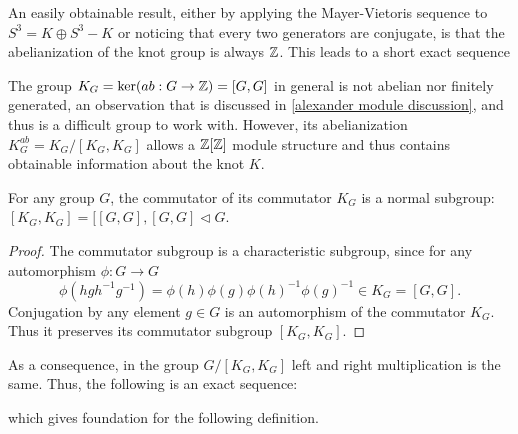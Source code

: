 An easily obtainable result, either by applying the Mayer-Vietoris sequence to $S^3=K\oplus S^3-K$ or noticing that every two generators are conjugate, is that the abelianization of the knot group is always $\operatorname{\mathbb{Z}}$. This leads to a short exact sequence
\begin{center}
\end{center}

The group $K_G=\ker(ab:G\to\operatorname{\mathbb{Z}})=[G, G]$ in general is not abelian nor finitely generated, an observation that is discussed in \cref{alexander module discussion}, and thus is a difficult group to work with. However, its abelianization $K_G^{ab}=K_G/[K_G, K_G]$ allows a $\operatorname{\mathbb{Z}}[\operatorname{\mathbb{Z}}]$ module structure and thus contains obtainable information about the knot $K$. 

\begin{lemma}
  For any group $G$, the commutator of its commutator $K_G$ is a normal subgroup: $[K_G, K_G]=[[G, G], [G, G]\triangleleft G$. 
\end{lemma}

\begin{proof}
  The commutator subgroup is a characteristic subgroup, since for any automorphism $\phi:G\to G$ 
  $$\phi(hgh^{-1}g^{-1})=\phi(h)\phi(g)\phi(h)^{-1}\phi(g)^{-1}\in K_G=[G, G].$$
  Conjugation by any element $g\in G$ is an automorphism of the commutator $K_G$. Thus it preserves its commutator subgroup $[K_G, K_G]$. 
\end{proof}

As a consequence, in the group $G/[K_G, K_G]$ left and right multiplication is the same. Thus, the following is an exact sequence:
\begin{center}
\end{center}
which gives foundation for the following definition.


